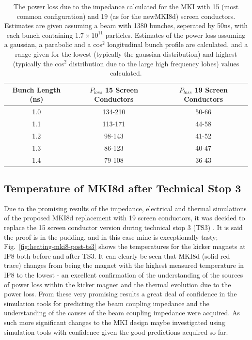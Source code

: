 \begin{table}
\caption{The power loss due to the impedance calculated for the MKI with 15 (most common configuration) and 19 (as for the newMKI8d) screen conductors. Estimates are given assuming a beam with 1380 bunches, seperated by 50ns, with each bunch containing $1.7 \times 10^{11}$ particles. Estimates of the power loss assuming a gaussian, a parabolic and a cos$^{2}$ longitudinal bunch profile are calculated, and a range given for the lowest (typically the gaussian distribution) and highest (typically the cos$^{2}$ distribution due to the large high frequency lobes) values calculated.}
\label{tab:heating-15-19-cond}
\begin{center}
\begin{tabular}{c | c | c}
Bunch Length (ns) & $P_{loss}$ 15 Screen Conductors & $P_{loss}$ 19 Screen Conductors \\ \hline
1.0 &  134-210 & 50-66 \\ \hline
1.1 &  113-171 & 44-58 \\ \hline
1.2 &  98-143 & 41-52 \\ \hline
1.3 &  86-123 & 40-47 \\ \hline
1.4 &  79-108 & 36-43 \\ \hline
\end{tabular}
\end{center}
\end{table}

\subsection{Temperature of MKI8d after Technical Stop 3}

Due to the promising results of the impedance, electrical and thermal simulations of the proposed MKI8d replacement with 19 screen conductors, it was decided to replace the 15 screen conductor version during technical stop 3 (TS3) \cite{Barnes:emisMKITemp}. It is said the proof is in the pudding, and in this case mine is exceptionally tasty; Fig.~\ref{fig:heating-mki8-post-ts3} shows the temperatures for the kicker magnets at IP8 both before and after TS3. It can clearly be seen that MKI8d (solid red trace) changes from being the magnet with the highest measured temperature in IP8 to the lowest - an excellent confirmation of the understanding of the sources of power loss within the kicker magnet and the thermal evolution due to the power loss. From these very promising results a great deal of confidence in the simulation tools for predicting the beam coupling impedance and the understanding of the causes of the beam coupling impedance were acquired. As such more significant changes to the MKI design maybe investigated using simulation tools with confidence given the good predictions acquired so far.

